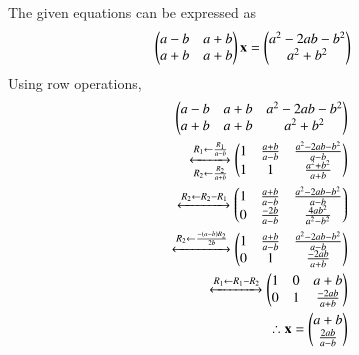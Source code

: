 
The given equations can be expressed as
\begin{align}
\begin{pmatrix}a-b & a+b \\
a+b & a+b
\end{pmatrix}\mathbf{x} &= \begin{pmatrix}a^2-2ab-b^2\\a^2 + b ^2\end{pmatrix}
\end{align}
Using row operations, 
\begin{align}
\begin{pmatrix}a-b & a+b & a^2-2ab-b^2  \\
a+b & a+b & a^2+b^2 
\end{pmatrix}\nonumber \\
\xleftrightarrow[R_2 \leftarrow \frac{R_2}{a+b}]{R_1 \leftarrow \frac{R_1}{a-b}}
\begin{pmatrix}1 & \frac{a+b}{a-b} & \frac{a^2-2ab-b^2}{a-b}  \\
1 & 1 & \frac{a^2+b^2}{a+b}
\end{pmatrix}\\
\xleftrightarrow[]{R_2 \leftarrow R_2 - R_1}
\begin{pmatrix}1 & \frac{a+b}{a-b} & \frac{a^2-2ab-b^2}{a-b}  \\
0 & \frac{-2b}{a-b} & \frac{4ab^2}{a^2-b^2}
\end{pmatrix}\\
\xleftrightarrow[]{R_2 \leftarrow  \frac{-\ensuremath{\left(a-b\right)}R_2}{2b}}
\begin{pmatrix}1 & \frac{a+b}{a-b} & \frac{a^2-2ab-b^2}{a-b}  \\
0 & 1 & \frac{-2ab}{a+b}
\end{pmatrix}\\
\xleftrightarrow[]{R_1 \leftarrow  R_1 - R_2}
\begin{pmatrix}1 & 0 & a+b \\
0 & 1 & \frac{-2ab}{a+b}
\end{pmatrix}\\
\therefore \mathbf{x} = \begin{pmatrix}a+b\\ \frac{2ab}{a-b}\end{pmatrix}
\end{align}

